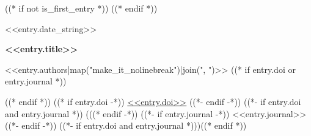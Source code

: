 ((* if not is_first_entry *))
\vspace{<<design.margins.entry_area.vertical_between>>}
((* endif *))

\begin{twocolentry}{
    <<entry.date_string>>
}
    \begin{minipage}{\linewidth}
        \textbf{<<entry.title>>}

        \vspace{<<design.margins.highlights_area.vertical_between_bullet_points>>}

        <<entry.authors|map("make_it_nolinebreak")|join(", ")>>
        ((* if entry.doi or entry.journal *))
        \vspace{<<design.margins.highlights_area.vertical_between_bullet_points>>}

        ((* endif *))
        ((* if entry.doi -*))
        \href{<<entry.doi_url>>}{<<entry.doi>>}
        ((*- endif -*))
        ((*- if entry.doi and entry.journal *)) (((* endif -*))
        ((*- if entry.journal -*))
        <<entry.journal>>
        ((*- endif -*))
        ((*- if entry.doi and entry.journal *)))((* endif *))
    \end{minipage}
\end{twocolentry}